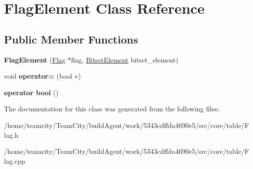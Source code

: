 \hypertarget{classFlagElement}{}\section{Flag\+Element Class Reference}
\label{classFlagElement}
\subsection*{Public Member Functions}
\begin{DoxyCompactItemize}
\item 
{\bfseries Flag\+Element} (\hyperlink{classFlag}{Flag} $\ast$flag, \hyperlink{classBitsetElement}{Bitset\+Element} bitset\+\_\+element)\hypertarget{classFlagElement_a710b228c975dcb93fb442b0cd3a2575f}{}\label{classFlagElement_a710b228c975dcb93fb442b0cd3a2575f}

\item 
void {\bfseries operator=} (bool v)\hypertarget{classFlagElement_a612f90ed54bd4b0f96472ce1478eaada}{}\label{classFlagElement_a612f90ed54bd4b0f96472ce1478eaada}

\item 
{\bfseries operator bool} ()\hypertarget{classFlagElement_a6335fd27d53907333b016e802e9bbbc9}{}\label{classFlagElement_a6335fd27d53907333b016e802e9bbbc9}

\end{DoxyCompactItemize}


The documentation for this class was generated from the following files\+:\begin{DoxyCompactItemize}
\item 
/home/teamcity/\+Team\+City/build\+Agent/work/5343cdffda4690e5/src/core/table/Flag.\+h\item 
/home/teamcity/\+Team\+City/build\+Agent/work/5343cdffda4690e5/src/core/table/Flag.\+cpp\end{DoxyCompactItemize}

